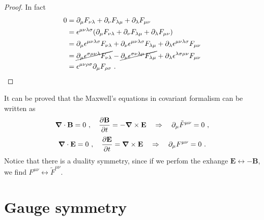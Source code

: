     \begin{proof}
        In fact
        \begin{equation*}
        \begin{aligned}
            0 & = \partial_\mu F_{\nu\lambda} + \partial_\nu F_{\lambda \mu} + \partial_\lambda F_{\mu \nu} \\ & = \epsilon^{\mu\nu\lambda\sigma} (\partial_\mu F_{\nu\lambda} + \partial_\nu F_{\lambda \mu} + \partial_\lambda F_{\mu \nu}) \\ & = \partial_\mu \epsilon^{\mu\nu\lambda\sigma} F_{\nu\lambda} + \partial_\nu \epsilon^{\mu\nu\lambda\sigma} F_{\lambda \mu} + \partial_\lambda \epsilon^{\mu\nu\lambda\sigma} F_{\mu \nu} \\ & = \cancel{\partial_\mu \epsilon^{\sigma\mu\nu\lambda} F_{\nu\lambda}} - \cancel{\partial_\nu \epsilon^{\sigma\nu\lambda\mu} F_{\lambda\mu}} + \partial_\lambda \epsilon^{\lambda\sigma\mu\nu} F_{\mu \nu} \\ & = \epsilon^{\mu\nu\rho\sigma} \partial_\mu  F_{\rho\sigma} ~.
        \end{aligned}
        \end{equation*}
    \end{proof}

    It can be proved that the Maxwell's equations in covariant formalism can be written as 
    \begin{equation*}
        \boldsymbol \nabla \cdot \mathbf B = 0 ~, \quad \frac{\partial\mathbf B}{\partial t} = - \boldsymbol \nabla \times \mathbf E \quad \Rightarrow \quad \partial_\mu \tilde F^{\mu\nu} = 0 ~,
    \end{equation*}
    \begin{equation*}
        \boldsymbol \nabla \cdot \mathbf E = 0 ~, \quad \frac{\partial\mathbf E}{\partial t} = \boldsymbol \nabla \times \mathbf E \quad \Rightarrow \quad \partial_\mu F^{\mu\nu} = 0 ~.
    \end{equation*}
    Notice that there is a duality symmetry, since if we perfom the exhange $\mathbf E \leftrightarrow - \mathbf B$, we find $F^{\mu\nu} \leftrightarrow \tilde F^{\mu\nu}$.

\section{Gauge symmetry}

